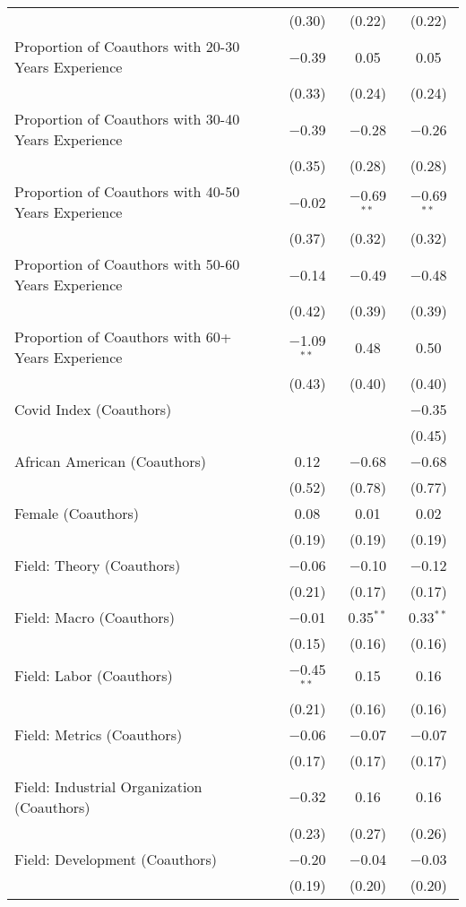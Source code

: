 \begin{table}[!htbp]
\begin{tabular}{lccc}
  & (0.30) & (0.22) & (0.22) \\
  Proportion of Coauthors with 20-30 Years Experience & $-$0.39 & 0.05 & 0.05 \\ 
  & (0.33) & (0.24) & (0.24) \\
  Proportion of Coauthors with 30-40 Years Experience & $-$0.39 & $-$0.28 & $-$0.26 \\ 
  & (0.35) & (0.28) & (0.28) \\
  Proportion of Coauthors with 40-50 Years Experience & $-$0.02 & $-$0.69$^{**}$ & $-$0.69$^{**}$ \\ 
  & (0.37) & (0.32) & (0.32) \\
  Proportion of Coauthors with 50-60 Years Experience & $-$0.14 & $-$0.49 & $-$0.48 \\ 
  & (0.42) & (0.39) & (0.39) \\
  Proportion of Coauthors with 60+ Years Experience & $-$1.09$^{**}$ & 0.48 & 0.50 \\ 
  & (0.43) & (0.40) & (0.40) \\
  Covid Index (Coauthors) &  &  & $-$0.35 \\ 
  & & & (0.45) \\
  African American (Coauthors) & 0.12 & $-$0.68 & $-$0.68 \\ 
  & (0.52) & (0.78) & (0.77) \\
  Female (Coauthors) & 0.08 & 0.01 & 0.02 \\ 
  & (0.19) & (0.19) & (0.19) \\
  Field: Theory (Coauthors) & $-$0.06 & $-$0.10 & $-$0.12 \\ 
  & (0.21) & (0.17) & (0.17) \\
  Field: Macro (Coauthors) & $-$0.01 & 0.35$^{**}$ & 0.33$^{**}$ \\ 
  & (0.15) & (0.16) & (0.16) \\
  Field: Labor (Coauthors) & $-$0.45$^{**}$ & 0.15 & 0.16 \\ 
  & (0.21) & (0.16) & (0.16) \\
  Field: Metrics (Coauthors) & $-$0.06 & $-$0.07 & $-$0.07 \\ 
  & (0.17) & (0.17) & (0.17) \\
  Field: Industrial Organization (Coauthors) & $-$0.32 & 0.16 & 0.16 \\ 
  & (0.23) & (0.27) & (0.26) \\
  Field: Development (Coauthors) & $-$0.20 & $-$0.04 & $-$0.03 \\ 
  & (0.19) & (0.20) & (0.20) \\

\end{tabular}
\end{table}
